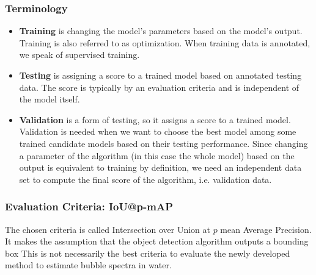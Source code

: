 		\subsubsection{Terminology}
			\begin{itemize} 
				\item \textbf{Training} is changing the model's parameters based on the model's output. Training is also referred to as optimization. When training data is annotated, we speak of supervised training. 
				\item \textbf{Testing} is assigning a score to a trained model based on annotated testing data. The score is typically by an evaluation criteria and is independent of the model itself. 
				\item \textbf{Validation} is a form of testing, so it assigns a score to a trained model. Validation is needed when we want to choose the best model among some trained candidate models based on their testing performance. Since changing a parameter of the algorithm (in this case the whole model) based on the output is equivalent to training by definition, we need an independent data set to compute the final score of the algorithm, i.e. validation data. 
			\end{itemize}				
		
		\subsubsection{Evaluation Criteria: IoU@p-mAP}
		  The chosen criteria is called Intersection over Union at $p$ mean Average Precision. It makes the assumption that the object detection algorithm outputs a bounding box 
			This is not necessarily the best criteria to evaluate the newly developed method to estimate bubble spectra in water.  



































